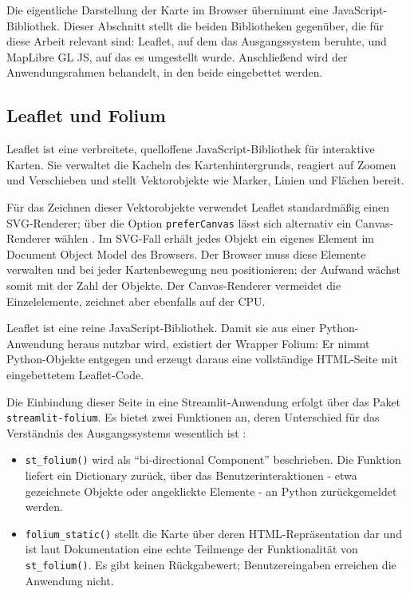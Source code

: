 \documentclass[12pt,a4paper]{report}
\begin{document}
Die eigentliche Darstellung der Karte im Browser übernimmt eine JavaScript-Bibliothek.
Dieser Abschnitt stellt die beiden Bibliotheken gegenüber, die für diese Arbeit relevant
sind: Leaflet, auf dem das Ausgangssystem beruhte, und MapLibre GL JS, auf das es
umgestellt wurde. Anschließend wird der Anwendungsrahmen behandelt, in den beide
eingebettet werden.



\subsection{Leaflet und Folium}
\label{subsec:leaflet}

Leaflet ist eine verbreitete, quelloffene JavaScript-Bibliothek für interaktive Karten. Sie
verwaltet die Kacheln des Kartenhintergrunds, reagiert auf Zoomen und Verschieben und
stellt Vektorobjekte wie Marker, Linien und Flächen bereit.

Für das Zeichnen dieser Vektorobjekte verwendet Leaflet standardmäßig einen SVG-Renderer;
über die Option \texttt{preferCanvas} lässt sich alternativ ein Canvas-Renderer wählen
\cite{LeafletDocs}. Im SVG-Fall erhält jedes Objekt ein eigenes Element im Document Object
Model des Browsers. Der Browser muss diese Elemente verwalten und bei jeder Kartenbewegung
neu positionieren; der Aufwand wächst somit mit der Zahl der Objekte. Der Canvas-Renderer
vermeidet die Einzelelemente, zeichnet aber ebenfalls auf der CPU.

Leaflet ist eine reine JavaScript-Bibliothek. Damit sie aus einer Python-Anwendung heraus
nutzbar wird, existiert der Wrapper Folium: Er nimmt Python-Objekte entgegen und erzeugt
daraus eine vollständige HTML-Seite mit eingebettetem Leaflet-Code.

Die Einbindung dieser Seite in eine Streamlit-Anwendung erfolgt über das Paket
\texttt{streamlit-folium}. Es bietet zwei Funktionen an, deren Unterschied für das
Verständnis des Ausgangssystems wesentlich ist \cite{StreamlitFolium}:

\begin{itemize}
    \item \texttt{st\_folium()} wird als \enquote{bi-directional Component} beschrieben.
    Die Funktion liefert ein Dictionary zurück, über das Benutzerinteraktionen - etwa
    gezeichnete Objekte oder angeklickte Elemente - an Python zurückgemeldet werden.
    \item \texttt{folium\_static()} stellt die Karte über deren HTML-Repräsentation dar und
    ist laut Dokumentation eine echte Teilmenge der Funktionalität von
    \texttt{st\_folium()}. Es gibt keinen Rückgabewert; Benutzereingaben erreichen die
    Anwendung nicht.
\end{itemize}
\end{document}
